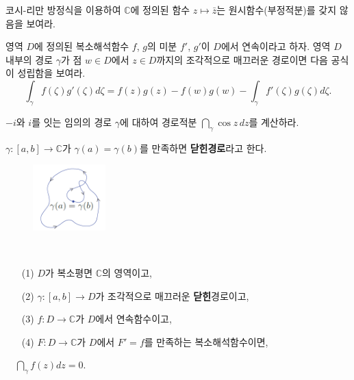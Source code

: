 \begin{salt_exercise} \label{ex-3-11}
코시-리만 방정식을 이용하여
$\mathbb C$에 정의된 함수 $z \mapsto \bar z$는 원시함수(부정적분)를 
갖지 않음을 보여라.
\end{salt_exercise}

\begin{salt_exercise}[부분적분 공식] \label{ex-3-12}
영역 $D$에 정의된 복소해석함수 $f$, $g$의 미분
$f'$, $g'$이 $D$에서 연속이라고 하자.
영역 $D$ 내부의 경로 $\gamma$가 
점 $w\in D$에서 $z\in D$까지의  조각적으로 매끄러운 경로이면
다음 공식이 성립함을 보여라.
\[
\int_\gamma f(\zeta)g'(\zeta)d\zeta 
= f(z)g(z) - f(w)g(w) - \int_\gamma f'(\zeta)g(\zeta)d\zeta.
\]
\end{salt_exercise}

\begin{salt_exercise} \label{ex-3-13}
$-i$와 $i$를 잇는 임의의 경로 $\gamma$에 대하여
경로적분 $\dint_\gamma \cos z\, dz$를 계산하라.
\end{salt_exercise}

\begin{salt_definition} \label{def-3-2}
$\gamma:[a,b] \to \mathbb C$가
$\gamma(a)= \gamma(b)$를 만족하면 {\bf 닫힌경로}라고 한다.
\end{salt_definition}

\begin{figure}[!h]
\begin{center}
\includegraphics[width=0.25\textwidth]{./SaltChapter/fig-3-0-1}
\end{center}
\end{figure}

\begin{salt_corollary} \label{coro-3-1}
\
\begin{itemize}
\item[(1)] $D$가 복소평면 $\mathbb C$의 영역이고,
\item[(2)] $\gamma : [a,b] \to D$가 조각적으로 매끄러운 {\bf 닫힌}경로이고,
\item[(3)] $f:D\to\mathbb C$가 $D$에서 연속함수이고,
\item[(4)] $F:D\to \mathbb C$가 $D$에서 $F'=f$를 만족하는 복소해석함수이면,
\end{itemize}
\ \ $\dint_\gamma f(z)dz = 0$.
\end{salt_corollary}

